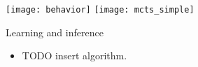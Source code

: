 \begin{block}{}
  \begin{center}
    \texttt{[image: behavior]}
    \texttt{[image: mcts\_simple]}
  \end{center}
\end{block}

\begin{block}{Learning and inference}
  \begin{itemize}
    \item TODO insert algorithm.
  \end{itemize}
\end{block}


\vfill

